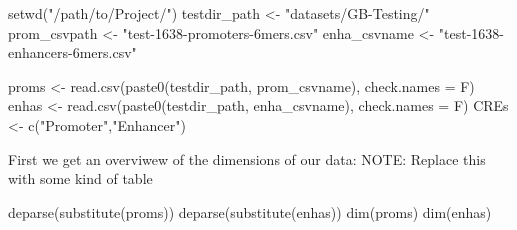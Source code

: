\documentclass[
  letterpaper,
]{article}
\newenvironment{Shaded}{\begin{snugshade}}{\end{snugshade}}
\newcommand{\AttributeTok}[1]{\textcolor[rgb]{0.40,0.45,0.13}{#1}}
\newcommand{\FunctionTok}[1]{\textcolor[rgb]{0.28,0.35,0.67}{#1}}
\newcommand{\NormalTok}[1]{\textcolor[rgb]{0.00,0.23,0.31}{#1}}
\newcommand{\OtherTok}[1]{\textcolor[rgb]{0.00,0.23,0.31}{#1}}
\newcommand{\StringTok}[1]{\textcolor[rgb]{0.13,0.47,0.30}{#1}}
\begin{document}
\begin{Shaded}
\begin{Highlighting}[]
\FunctionTok{setwd}\NormalTok{(}\StringTok{"/path/to/Project/"}\NormalTok{)}
\NormalTok{testdir\_path }\OtherTok{\textless{}{-}} \StringTok{"datasets/GB{-}Testing/"}
\NormalTok{prom\_csvpath }\OtherTok{\textless{}{-}} \StringTok{"test{-}1638{-}promoters{-}6mers.csv"} 
\NormalTok{enha\_csvname }\OtherTok{\textless{}{-}} \StringTok{"test{-}1638{-}enhancers{-}6mers.csv"} 

\NormalTok{proms }\OtherTok{\textless{}{-}} \FunctionTok{read.csv}\NormalTok{(}\FunctionTok{paste0}\NormalTok{(testdir\_path, }
\NormalTok{                         prom\_csvname),}
                         \AttributeTok{check.names =}\NormalTok{ F)}
\NormalTok{enhas }\OtherTok{\textless{}{-}} \FunctionTok{read.csv}\NormalTok{(}\FunctionTok{paste0}\NormalTok{(testdir\_path, }
\NormalTok{                         enha\_csvname),}
                         \AttributeTok{check.names =}\NormalTok{ F)}
\NormalTok{CREs }\OtherTok{\textless{}{-}} \FunctionTok{c}\NormalTok{(}\StringTok{"Promoter"}\NormalTok{,}\StringTok{"Enhancer"}\NormalTok{)}
\end{Highlighting}
\end{Shaded}

\vspace{0.2cm}

First we get an overviwew of the dimensions of our data: NOTE: Replace
this with some kind of table \vspace{0.2cm}

\begin{Shaded}
\begin{Highlighting}[]
\FunctionTok{deparse}\NormalTok{(}\FunctionTok{substitute}\NormalTok{(proms))}
\FunctionTok{deparse}\NormalTok{(}\FunctionTok{substitute}\NormalTok{(enhas))}
\FunctionTok{dim}\NormalTok{(proms)}
\FunctionTok{dim}\NormalTok{(enhas)}
\end{Highlighting}
\end{Shaded}
\end{document}
